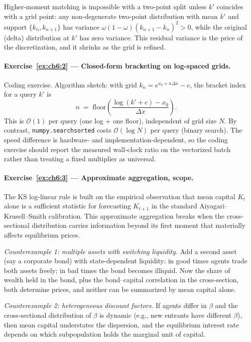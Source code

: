 \documentclass[11pt,a4paper]{report}
\begin{document}
Higher-moment matching is impossible with a two-point split unless $k'$ coincides with a grid point: any non-degenerate two-point distribution with mean $k'$ and support $\{k_n, k_{n+1}\}$ has variance $\omega(1-\omega)(k_{n+1}-k_n)^2 > 0$, while the original (delta) distribution at $k'$ has zero variance.  This residual variance is the price of the discretization, and it shrinks as the grid is refined.

\paragraph{Exercise~\ref{ex:ch6:2} --- Closed-form bracketing on log-spaced grids.}
Coding exercise.  Algorithm sketch: with grid $k_n = e^{x_0 + n\Delta x} - c$, the bracket index for a query $k'$ is
\[
   n \;=\; \mathrm{floor}\!\left(\frac{\log(k' + c) - x_0}{\Delta x}\right).
\]
This is $\mathcal{O}(1)$ per query (one log + one floor), independent of grid size $N$.  By contrast, \texttt{numpy.searchsorted} costs $\mathcal{O}(\log N)$ per query (binary search).  The speed difference is hardware- and implementation-dependent, so the coding exercise should report the measured wall-clock ratio on the vectorized batch rather than treating a fixed multiplier as universal.

\paragraph{Exercise~\ref{ex:ch6:3} --- Approximate aggregation, scope.}
The KS log-linear rule is built on the empirical observation that mean capital $K_t$ alone is a sufficient statistic for forecasting $K_{t+1}$ in the standard Aiyagari--Krusell--Smith calibration.  This approximate aggregation breaks when the cross-sectional distribution carries information beyond its first moment that materially affects equilibrium prices.

\emph{Counterexample 1: multiple assets with switching liquidity.}  Add a second asset (say a corporate bond) with state-dependent liquidity: in good times agents trade both assets freely; in bad times the bond becomes illiquid.  Now the share of wealth held in the bond, plus the bond--capital correlation in the cross-section, both determine prices, and neither can be summarized by mean capital alone.

\emph{Counterexample 2: heterogeneous discount factors.}  If agents differ in $\beta$ and the cross-sectional distribution of $\beta$ is dynamic (e.g., new entrants have different $\beta$), then mean capital understates the dispersion, and the equilibrium interest rate depends on which subpopulation holds the marginal unit of capital.
\end{document}
